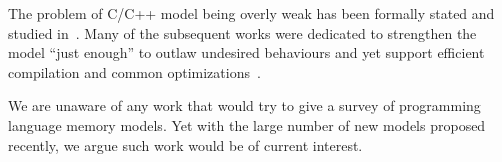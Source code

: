 The problem of C/C++ model being overly weak  has 
been formally stated and studied in~\cite{Batty-al:ESOP15}.
Many of the subsequent works were dedicated 
to strengthen the model ``just enough'' to outlaw undesired behaviours
and yet support efficient compilation and 
common optimizations~\cite{Jeffrey-Riely:LICS16, PichonPharabod-Sewell:POPL16, 
Podkopaev-al:CoRR16, Kang-al:POPL17, Chakraborty-Vafeiadis:POPL19, 
Paviotti-el:ESOP20, Lee-el:PLDI20}. 

We are unaware of any work that would try to give 
a survey of programming language memory models.
Yet with the large number of new models proposed recently,
we argue such work would be of current interest. 
